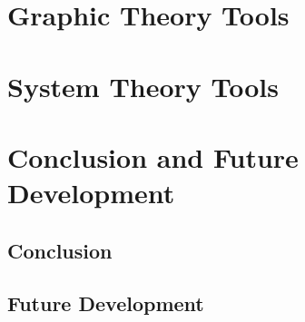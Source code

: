 \documentclass[a4paper,twoside, openright,12pt]{report}
\begin{document}
\chapter{Graphic Theory Tools}\label{chapter2}



\chapter{System Theory Tools}\label{chapter3}



\chapter{Conclusion and Future Development}
\section{Conclusion}


\section{Future Development}
%


\cleardoublepage
{} 
\listoffigures 	 %

% 
% 
% 


\end{document}
